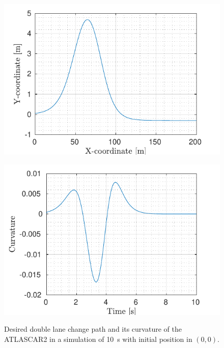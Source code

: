 \begin{figure}[!h]
	\begin{minipage}[t]{0.5\textwidth}
		\includegraphics[width=\textwidth]{../../MATLAB/lane_following_curve/figure/Reference_curve.pdf}
		\subcaption{}
		\label{fig:reference_laneFollowing_curve}
	\end{minipage}
	\begin{minipage}[t]{0.5\textwidth}
		\includegraphics[width=\textwidth]{../../MATLAB/lane_following_curve/figure/Curvature_curve.pdf}
		\subcaption{}
		\label{fig:curvature_laneFollowing_curve}
	\end{minipage}
	\caption{Desired double lane change path and its curvature of the ATLASCAR2 in a simulation of \SI{10}{s} with initial position in $(0,0)$.}
	\label{fig:laneFollowing_desired_curve}
\end{figure}
